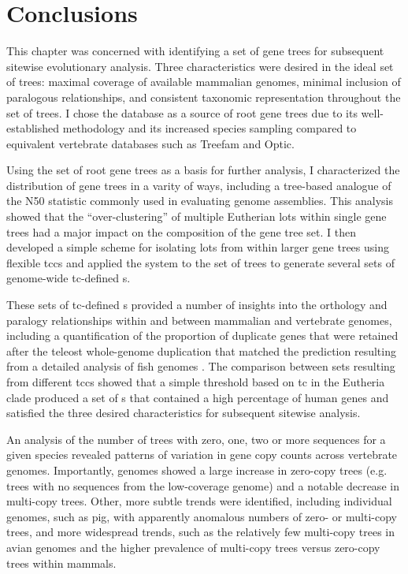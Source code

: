 \section{Conclusions}

This chapter was concerned with identifying a set of gene trees for
subsequent sitewise evolutionary analysis. Three characteristics were
desired in the ideal set of trees: maximal coverage of available
mammalian genomes, minimal inclusion of paralogous relationships, and
consistent taxonomic representation throughout the set of trees. I
chose the \ens \cmp database as a source of root gene trees due to its
well-established methodology \citep{Heger2008,Vilella2009} and its
increased species sampling compared to equivalent vertebrate databases
such as Treefam and Optic.

Using the set of root \cmp gene trees as a basis for further analysis,
I characterized the distribution of gene trees in a varity of ways,
including a tree-based analogue of the N50 statistic commonly used in
evaluating genome assemblies. This analysis showed that the
``over-clustering'' of multiple Eutherian \acp{lot} within single \cmp
gene trees had a major impact on the composition of the gene tree
set. I then developed a simple scheme for isolating \acp{lot} from
within larger gene trees using flexible \acp{tcc} and applied the
system to the set of \cmp trees to generate several sets of
genome-wide \ac{tc}-defined \subtr{}s.

These sets of \ac{tc}-defined \subtr{}s provided a number of insights
into the orthology and paralogy relationships within and between
mammalian and vertebrate genomes, including a quantification of the
proportion of duplicate genes that were retained after the teleost
whole-genome duplication that matched the prediction resulting from a
detailed analysis of fish genomes \citep{Brunet2006}. The comparison
between \subtr{} sets resulting from different \acp{tcc} showed that a
simple threshold based on \ac{tc} in the Eutheria clade produced a set
of \subtr{}s that contained a high percentage of human genes and
satisfied the three desired characteristics for subsequent sitewise
analysis.

An analysis of the number of trees with zero, one, two or more
sequences for a given species revealed patterns of variation in gene
copy counts across vertebrate genomes. Importantly, \lcv genomes
showed a large increase in zero-copy trees (e.g. trees with no
sequences from the low-coverage genome) and a notable decrease in
multi-copy trees. Other, more subtle trends were identified, including
individual genomes, such as pig, with apparently anomalous numbers of
zero- or multi-copy trees, and more widespread trends, such as the
relatively few multi-copy trees in avian genomes and the higher
prevalence of multi-copy trees versus zero-copy trees within mammals.

